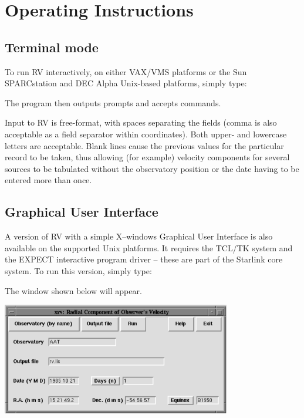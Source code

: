\documentclass[11pt,noabs,nolof]{starlink}
\begin{document}
\section{Operating Instructions}
\subsection{Terminal mode}

To run RV interactively, on either VAX/VMS platforms or
the Sun SPARCstation and DEC Alpha Unix-based platforms, simply type:
\begin{terminalv}
\end{terminalv}
The program then outputs prompts and accepts commands.

Input to RV is free-format, with spaces separating the fields (comma is
also acceptable as a field separator within coordinates).  Both upper-
and lowercase letters are acceptable.  Blank lines cause the previous
values for the particular record to be taken, thus allowing (for
example) velocity components for several sources to be tabulated
without the observatory position or the date having to be entered more
than once.

\subsection{Graphical User Interface}

A version of RV with a simple X--windows Graphical User Interface is
also available on the supported Unix platforms. It requires the TCL/TK
system and the EXPECT interactive program driver -- these are part of the
Starlink core system.  To run this version, simply type:

\begin{terminalv}
\end{terminalv}

The window shown below will appear.

\begin{center}
\includegraphics[width=0.75\textwidth]{sun78_fig}
\end{center}
\end{document}
